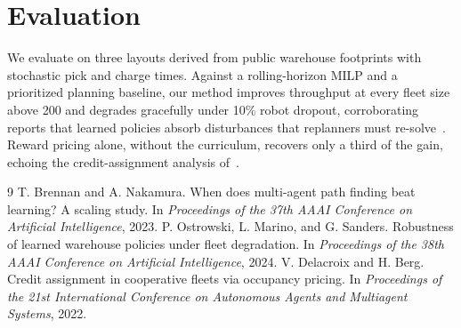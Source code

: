 \documentclass[10pt,twocolumn]{article}
\begin{document}
\section{Evaluation}
We evaluate on three layouts derived from public warehouse footprints with
stochastic pick and charge times. Against a rolling-horizon MILP and a
prioritized planning baseline, our method improves throughput at every fleet
size above 200 and degrades gracefully under 10\% robot dropout,
corroborating reports that learned policies absorb disturbances that
replanners must re-solve~\cite{ostrowski2024robust}. Reward pricing alone,
without the curriculum, recovers only a third of the gain, echoing the
credit-assignment analysis of~\cite{delacroix2022credit}.

\begin{thebibliography}{9}
 T. Brennan and A. Nakamura.
When does multi-agent path finding beat learning? A scaling study.
In \textit{Proceedings of the 37th AAAI Conference on Artificial Intelligence}, 2023.
 P. Ostrowski, L. Marino, and G. Sanders.
Robustness of learned warehouse policies under fleet degradation.
In \textit{Proceedings of the 38th AAAI Conference on Artificial Intelligence}, 2024.
 V. Delacroix and H. Berg.
Credit assignment in cooperative fleets via occupancy pricing.
In \textit{Proceedings of the 21st International Conference on Autonomous Agents and Multiagent Systems}, 2022.
\end{thebibliography}
\end{document}
